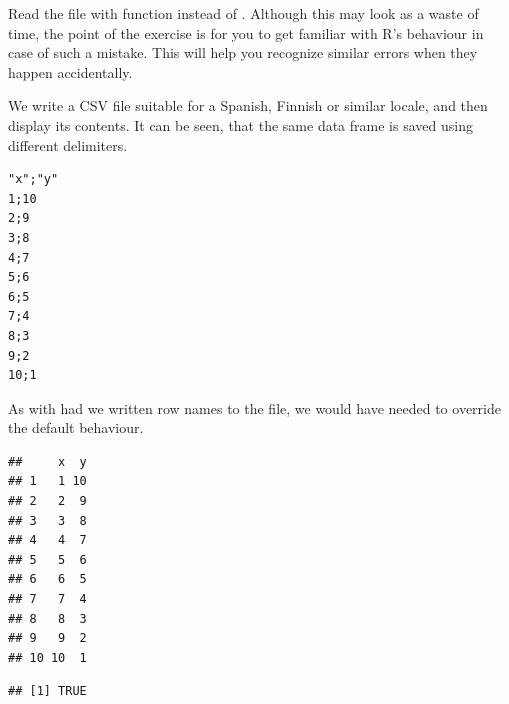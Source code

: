 \documentclass[krantz2]{krantz}\usepackage{knitr}%
\begin{document}
\begin{playground}
Read the file with function  instead of . Although this may look as a waste of time, the point of the exercise is for you to get familiar with R's behaviour in case of such a mistake. This will help you recognize similar errors when they happen accidentally.
\end{playground}

We write a CSV file suitable for a Spanish, Finnish or similar locale, and then display its contents. It can be seen, that the same data frame is saved using different delimiters.
\begin{knitrout}\footnotesize
{}\color{fgcolor}\begin{kframe}
\begin{alltt}
  \hlstd{=} \hlstd{,}  \hlstd{=} \hlstd{)}
\hlstd{(}\hlstd{,}  \hlstd{=} \hlstd{)}
\end{alltt}
\end{kframe}
\end{knitrout}

\begin{knitrout}\footnotesize
{}\color{fgcolor}\begin{kframe}
\begin{verbatim}
"x";"y"
1;10
2;9
3;8
4;7
5;6
6;5
7;4
8;3
9;2
10;1
\end{verbatim}
\end{kframe}
\end{knitrout}

As with  had we written row names to the file, we would have needed to override the default behaviour.
\begin{knitrout}\footnotesize
{}\color{fgcolor}\begin{kframe}
\begin{alltt}
 \hlkwb{<-} \hlstd{(} \hlstd{=} \hlstd{)}
\end{alltt}
\begin{verbatim}
##     x  y
## 1   1 10
## 2   2  9
## 3   3  8
## 4   4  7
## 5   5  6
## 6   6  5
## 7   7  4
## 8   8  3
## 9   9  2
## 10 10  1
\end{verbatim}
\begin{alltt}
  \hlstd{=} \hlstd{)}
\end{alltt}
\begin{verbatim}
## [1] TRUE
\end{verbatim}
\end{kframe}
\end{knitrout}
\end{document}
